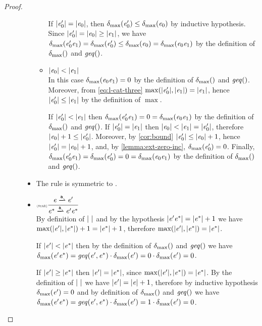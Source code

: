 \begin{proof}
\begin{description}
\begin{itemize}
\begin{itemize}
                 If ${\mid}{\mathit {e}_0'}{\mid}={\mid}{\mathit {e}_0}{\mid}$, then ${\delta_{\max}}({\mathit {e}_0'})\leq{\delta_{\max}}({\mathit {e}_0})$ by inductive hypothesis. Since ${\mid}{\mathit {e}_0'}{\mid}={\mid}{\mathit {e}_0}{\mid}\geq{\mid}{\ensuremath{\mathit {e}}_1}{\mid}$, we have ${\delta_{\max}}({\mathit {e}_0'\mathit {e}_1})={\delta_{\max}}({\mathit {e}_0'})\leq{\delta_{\max}}({\mathit {e}_0})={\delta_{\max}}({\mathit {e}_0\mathit {e}_1})$ by the definition of ${\delta_{\max}}({})$ and $\mathit{geq}()$.
           \item ${\mid}{\mathit {e}_0}{\mid}<{\mid}{\mathit {e}_1}{\mid}$\\
                 In this case ${\delta_{\max}}({\mathit {e}_0\mathit {e}_1})=0$ by the definition of ${\delta_{\max}}({})$ and $\mathit{geq}()$. Moreover, from \cref{eq:l-cat-three} $\max({\mid}{\mathit {e}_0'}{\mid},{\mid}{\mathit {e}_1}{\mid})={\mid}{\mathit {e}_1}{\mid}$, hence ${\mid}{\mathit {e}_0'}{\mid}\leq{\mid}{\ensuremath{\mathit {e}}_1}{\mid}$ by the definition of $\max$.

                 If ${\mid}{\mathit {e}_0'}{\mid}<{\mid}{\mathit {e}_1}{\mid}$ then ${\delta_{\max}}({\mathit {e}_0'\mathit {e}_1})=0={\delta_{\max}}({\mathit {e}_0\mathit {e}_1})$ by the definition of ${\delta_{\max}}({})$ and $\mathit{geq}()$. If ${\mid}{\mathit {e}_0'}{\mid}={\mid}{\mathit {e}_1}{\mid}$ then ${\mid}{\mathit {e}_0}{\mid}<{\mid}{\mathit {e}_1}{\mid}={\mid}{\mathit {e}_0'}{\mid}$, therefore ${\mid}{\mathit {e}_0}{\mid}+1\leq{\mid}{\ensuremath{\mathit {e}}_0'}{\mid}$. Moreover, by \cref{cor:bound} ${\mid}{\mathit {e}'_0}{\mid}\leq{\mid}{\ensuremath{\mathit {e}}_0}{\mid}+1$, hence ${\mid}{\mathit {e}_0'}{\mid}={\mid}{\mathit {e}_0}{\mid}+1$, and, by \cref{lemma:ext-zero-inc}, ${\delta_{\max}}({\mathit {e}_0'})=0$. Finally,
                 ${\delta_{\max}}({\mathit {e}_0'\mathit {e}_1})={\delta_{\max}}({\mathit {e}_0'})=0={\delta_{\max}}({\mathit {e}_0\mathit {e}_1})$ by the definition of ${\delta_{\max}}({})$ and $\mathit{geq}()$.
          \end{itemize}


    \item The rule  is symmetric to .
    \item $\Rule{star}{\re\parDer{\sym}\re'}{\starop{\re}\parDer{\sym}\re'\starop{\re}}{}$\\[2ex]
          By definition of ${\mid}{\ }{\mid}$ and by the hypothesis ${\mid}{\mathit {e}'{\mathit {e}}^*}{\mid}={\mid}{{\mathit {e}}^*}{\mid}+1$ we have
          $\max({\mid}{\mathit {e}'}{\mid},{\mid}{{\mathit {e}}^*}{\mid})+1={\mid}{{\mathit {e}}^*}{\mid}+1$, therefore
          $\max({\mid}{\mathit {e}'}{\mid},{\mid}{{\mathit {e}}^*}{\mid})={\mid}{{\mathit {e}}^*}{\mid}$.

          If ${\mid}{\mathit {e}'}{\mid}<{\mid}{{\mathit {e}}^*}{\mid}$ then by the definition of ${\delta_{\max}}({})$ and $\mathit{geq}()$ we have ${\delta_{\max}}({\mathit {e}'{\mathit {e}}^*})=\mathit{geq}({\mathit {e}'},{{\mathit {e}}^*})\cdot{\delta_{\max}}({\mathit {e}'})=0\cdot{\delta_{\max}}({\mathit {e}'})=0$.

          If ${\mid}{\mathit {e}'}{\mid}\geq{\mid}{{\ensuremath{\mathit {e}}}^*}{\mid}$ then ${\mid}{\mathit {e}'}{\mid}={\mid}{{\mathit {e}}^*}{\mid}$, since $\max({\mid}{\mathit {e}'}{\mid},{\mid}{{\mathit {e}}^*}{\mid})={\mid}{{\mathit {e}}^*}{\mid}$.
          By the definition of ${\mid}{\ }{\mid}$ we have ${\mid}{\mathit {e}'}{\mid}={\mid}{\mathit {e}}{\mid}+1$, therefore
          by inductive hypothesis ${\delta_{\max}}({\mathit {e}'})=0$ and by definition of ${\delta_{\max}}({})$ and $\mathit{geq}()$ we have ${\delta_{\max}}({\mathit {e}'{\mathit {e}}^*})=\mathit{geq}({\mathit {e}'},{{\mathit {e}}^*})\cdot{\delta_{\max}}({\mathit {e}'})=1\cdot{\delta_{\max}}({\mathit {e}'})=0$.
   \end{itemize}
 \end{description}
\end{proof}

